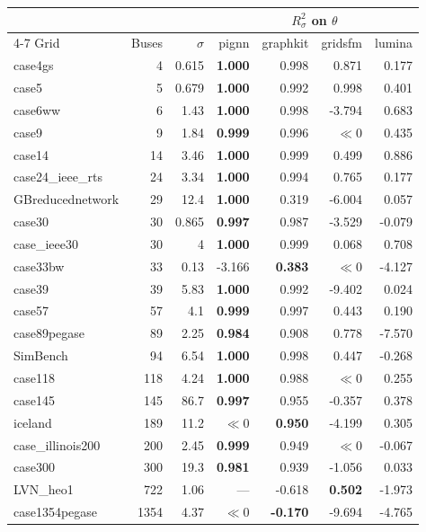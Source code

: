 \documentclass[10pt]{article}
\begin{document}
\begin{table}[H]
\centering\small
\begin{tabular}{lrr rrrr}
\toprule
 & & & \multicolumn{4}{c}{$R^2_{\sigma}$ on $\theta$} \\
\cmidrule(lr){4-7}
Grid & Buses & $\sigma$ & pignn & graphkit & gridsfm & lumina \\
\midrule
case4gs & 4 & 0.615 & \textbf{1.000} & 0.998 & 0.871 & 0.177 \\
case5 & 5 & 0.679 & \textbf{1.000} & 0.992 & 0.998 & 0.401 \\
case6ww & 6 & 1.43 & \textbf{1.000} & 0.998 & -3.794 & 0.683 \\
case9 & 9 & 1.84 & \textbf{0.999} & 0.996 & $\ll$0 & 0.435 \\
case14 & 14 & 3.46 & \textbf{1.000} & 0.999 & 0.499 & 0.886 \\
case24\_ieee\_rts & 24 & 3.34 & \textbf{1.000} & 0.994 & 0.765 & 0.177 \\
GBreducednetwork & 29 & 12.4 & \textbf{1.000} & 0.319 & -6.004 & 0.057 \\
case30 & 30 & 0.865 & \textbf{0.997} & 0.987 & -3.529 & -0.079 \\
case\_ieee30 & 30 & 4 & \textbf{1.000} & 0.999 & 0.068 & 0.708 \\
case33bw & 33 & 0.13 & -3.166 & \textbf{0.383} & $\ll$0 & -4.127 \\
case39 & 39 & 5.83 & \textbf{1.000} & 0.992 & -9.402 & 0.024 \\
case57 & 57 & 4.1 & \textbf{0.999} & 0.997 & 0.443 & 0.190 \\
case89pegase & 89 & 2.25 & \textbf{0.984} & 0.908 & 0.778 & -7.570 \\
SimBench & 94 & 6.54 & \textbf{1.000} & 0.998 & 0.447 & -0.268 \\
case118 & 118 & 4.24 & \textbf{1.000} & 0.988 & $\ll$0 & 0.255 \\
case145 & 145 & 86.7 & \textbf{0.997} & 0.955 & -0.357 & 0.378 \\
iceland & 189 & 11.2 & $\ll$0 & \textbf{0.950} & -4.199 & 0.305 \\
case\_illinois200 & 200 & 2.45 & \textbf{0.999} & 0.949 & $\ll$0 & -0.067 \\
case300 & 300 & 19.3 & \textbf{0.981} & 0.939 & -1.056 & 0.033 \\
LVN\_heo1 & 722 & 1.06 & --- & -0.618 & \textbf{0.502} & -1.973 \\
case1354pegase & 1354 & 4.37 & $\ll$0 & \textbf{-0.170} & -9.694 & -4.765 \\

\end{tabular}
\end{table}
\end{document}
